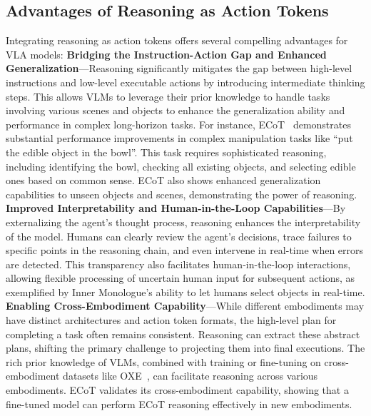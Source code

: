 \documentclass[10pt, a4paper, logo, copyright]{googledeepmind} %
\begin{document}
\subsection{Advantages of Reasoning as Action Tokens}
Integrating reasoning as action tokens offers several compelling advantages for VLA models: 
\noindent \textbf{Bridging the Instruction-Action Gap and Enhanced Generalization}---Reasoning significantly mitigates the gap between high-level instructions and low-level executable actions by introducing intermediate thinking steps. This allows VLMs to leverage their prior knowledge to handle tasks involving various scenes and objects to enhance the generalization ability and performance in complex long-horizon tasks. For instance, ECoT~\cite{ECoT} demonstrates substantial performance improvements in complex manipulation tasks like ``put the edible object in the bowl''. This task requires sophisticated reasoning, including identifying the bowl, checking all existing objects, and selecting edible ones based on common sense. ECoT also shows enhanced generalization capabilities to unseen objects and scenes, demonstrating the power of reasoning. 
\noindent \textbf{Improved Interpretability and Human-in-the-Loop Capabilities}---By externalizing the agent's thought process, reasoning enhances the interpretability of the model. Humans can clearly review the agent's decisions, trace failures to specific points in the reasoning chain, and even intervene in real-time when errors are detected. This transparency also facilitates human-in-the-loop interactions, allowing flexible processing of uncertain human input for subsequent actions, as exemplified by Inner Monologue's ability to let humans select objects in real-time. 
\noindent \textbf{Enabling Cross-Embodiment Capability}---While different embodiments may have distinct architectures and action token formats, the high-level plan for completing a task often remains consistent. Reasoning can extract these abstract plans, shifting the primary challenge to projecting them into final executions. The rich prior knowledge of VLMs, combined with training or fine-tuning on cross-embodiment datasets like OXE~\cite{RT-X}, can facilitate reasoning across various embodiments. ECoT validates its cross-embodiment capability, showing that a fine-tuned model can perform ECoT reasoning effectively in new embodiments.
\end{document}
